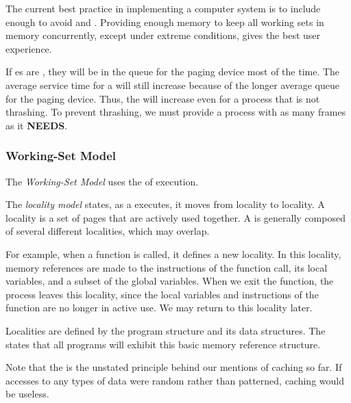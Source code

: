 \begin{remark*}
  The current best practice in implementing a computer system is to include enough  to avoid  and .
  Providing enough memory to keep all working sets in memory concurrently, except under extreme conditions, gives the best user experience.
\end{remark*}

If es are , they will be in the queue for the paging device most of the time.
The average service time for a  will still increase because of the longer average queue for the paging device.
Thus, the  will increase even for a process that is not thrashing.
To prevent thrashing, we must provide a process with as many frames as it \textbf{NEEDS}.

\subsubsection{Working-Set Model}\label{subsubsec:Working_Set_Model}
The \emph{Working-Set Model} uses the  of  execution.

\begin{definition}\label{def:Locality_Model}
  The \emph{locality model} states, as a  executes, it moves from locality to locality.
  A locality is a set of pages that are actively used together.
  A  is generally composed of several different localities, which may overlap.

  For example, when a function is called, it defines a new locality.
  In this locality, memory references are made to the instructions of the function call, its local variables, and a subset of the global variables.
  When we exit the function, the process leaves this locality, since the local variables and instructions of the function are no longer in active use.
  We may return to this locality later.
\end{definition}

Localities are defined by the program structure and its data structures.
The  states that all programs will exhibit this basic memory reference structure.

\begin{blackbox}
  \begin{remark*}
    Note that the  is the unstated principle behind our mentions of caching so far.
    If accesses to any types of data were random rather than patterned, caching would be useless.
  \end{remark*}
\end{blackbox}

